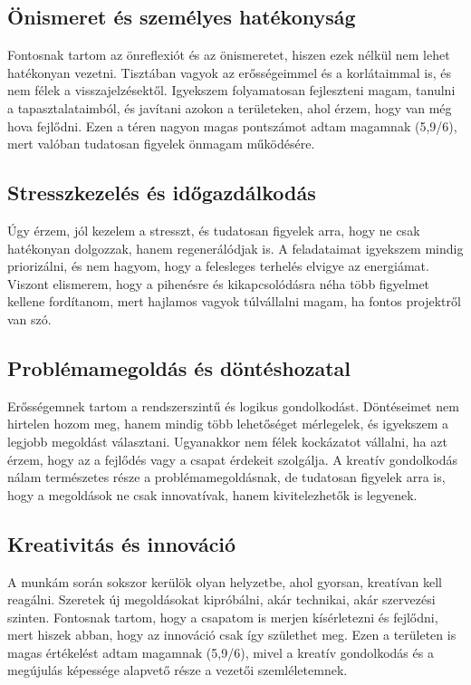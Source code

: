 \subsection{Önismeret és személyes hatékonyság}

Fontosnak tartom az önreflexiót és az önismeretet, hiszen ezek nélkül nem lehet hatékonyan vezetni.
Tisztában vagyok az erősségeimmel és a korlátaimmal is, és nem félek a visszajelzésektől.
Igyekszem folyamatosan fejleszteni magam, tanulni a tapasztalataimból, 
és javítani azokon a területeken, ahol érzem, hogy van még hova fejlődni.
Ezen a téren nagyon magas pontszámot adtam magamnak (5,9/6), mert valóban tudatosan figyelek önmagam működésére.

\subsection{Stresszkezelés és időgazdálkodás}

Úgy érzem, jól kezelem a stresszt, és tudatosan figyelek arra, hogy ne csak hatékonyan dolgozzak, hanem regenerálódjak is.
A feladataimat igyekszem mindig priorizálni, és nem hagyom, hogy a felesleges terhelés elvigye az energiámat.
Viszont elismerem, hogy a pihenésre és kikapcsolódásra néha több 
figyelmet kellene fordítanom, mert hajlamos vagyok túlvállalni magam, ha fontos projektről van szó.

\subsection{Problémamegoldás és döntéshozatal}

Erősségemnek tartom a rendszerszintű és logikus gondolkodást.
Döntéseimet nem hirtelen hozom meg, hanem mindig több lehetőséget mérlegelek, és igyekszem a legjobb megoldást választani.
Ugyanakkor nem félek kockázatot vállalni, ha azt érzem, hogy az a fejlődés vagy a csapat érdekeit szolgálja.
A kreatív gondolkodás nálam természetes része a problémamegoldásnak, de tudatosan figyelek arra is, 
hogy a megoldások ne csak innovatívak, hanem kivitelezhetők is legyenek.

\subsection{Kreativitás és innováció}

A munkám során sokszor kerülök olyan helyzetbe, ahol gyorsan, kreatívan kell reagálni.
Szeretek új megoldásokat kipróbálni, akár technikai, akár szervezési szinten.
Fontosnak tartom, hogy a csapatom is merjen kísérletezni és fejlődni, mert hiszek abban, 
hogy az innováció csak így születhet meg.
Ezen a területen is magas értékelést adtam magamnak (5,9/6), mivel a kreatív gondolkodás 
és a megújulás képessége alapvető része a vezetői szemléletemnek.

